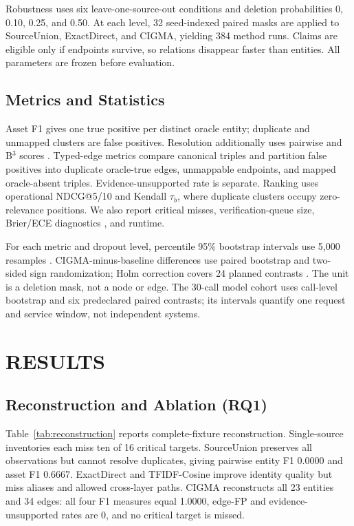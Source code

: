 \documentclass[a4paper,twoside]{article}
\newcommand{\cigma}{CIGMA\xspace}
\newcommand{\meth}[1]{\textsf{#1}}         %
\begin{document}
Robustness uses six leave-one-source-out conditions and deletion probabilities 0, 0.10, 0.25, and 0.50. At each level, 32 seed-indexed paired masks are applied to \meth{SourceUnion}, \meth{ExactDirect}, and \cigma, yielding 384 method runs. Claims are eligible only if endpoints survive, so relations disappear faster than entities. All parameters are frozen before evaluation.

\subsection{Metrics and Statistics}

Asset F1 gives one true positive per distinct oracle entity; duplicate and unmapped clusters are false positives. Resolution additionally uses pairwise and B$^3$ scores \cite{binette2023ereval}. Typed-edge metrics compare canonical triples and partition false positives into duplicate oracle-true edges, unmappable endpoints, and mapped oracle-absent triples. Evidence-unsupported rate is separate. Ranking uses operational NDCG@5/10 \cite{jarvelin2002cumulated} and Kendall $\tau_b$, where duplicate clusters occupy zero-relevance positions. We also report critical misses, verification-queue size, Brier/ECE diagnostics \cite{guo2017calibration}, and runtime.

For each metric and dropout level, percentile 95\% bootstrap intervals use 5,000 resamples \cite{efron1979bootstrap}. \cigma-minus-baseline differences use paired bootstrap and two-sided sign randomization; Holm correction covers 24 planned contrasts \cite{holm1979simple}. The unit is a deletion mask, not a node or edge. The 30-call model cohort uses call-level bootstrap and six predeclared paired contrasts; its intervals quantify one request and service window, not independent systems.

\section{\uppercase{Results}}
\label{sec:results}

\subsection{Reconstruction and Ablation (RQ1)}

Table~\ref{tab:reconstruction} reports complete-fixture reconstruction. Single-source inventories each miss ten of 16 critical targets. \meth{SourceUnion} preserves all observations but cannot resolve duplicates, giving pairwise entity F1 0.0000 and asset F1 0.6667. \meth{ExactDirect} and \meth{TFIDF-Cosine} improve identity quality but miss aliases and allowed cross-layer paths. \cigma reconstructs all 23 entities and 34 edges: all four F1 measures equal 1.0000, edge-FP and evidence-unsupported rates are 0, and no critical target is missed.
\end{document}
